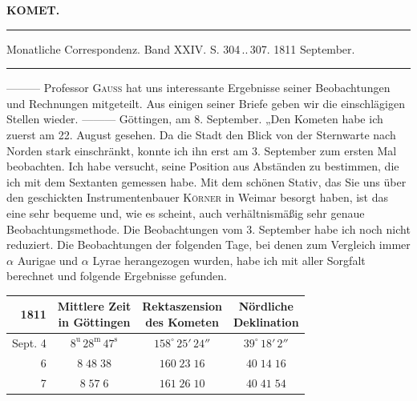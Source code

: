 \clearpage{}\hypertarget{native-340-lower}{}\label{native-340-lower}
\begin{center}\textbf{KOMET.}\par\vspace{4pt}\hrule\vspace{4pt}\fontsize{10}{12}\selectfont Monatliche Correspondenz. Band XXIV. S. 304\,..\,307. 1811 September.\par\vspace{4pt}\hrule\vspace{4pt}\end{center}

\par\indent ---\;---\;--- Professor \textsc{Gauss} hat uns interessante Ergebnisse seiner Beobachtungen und Rechnungen mitgeteilt. Aus einigen seiner Briefe geben wir die einschlägigen Stellen wieder. ---\;---\;--- Göttingen, am 8. September. „Den Kometen habe ich zuerst am 22. August gesehen. Da die Stadt den Blick von der Sternwarte nach Norden stark einschränkt, konnte ich ihn erst am 3. September zum ersten Mal beobachten. Ich habe versucht, seine Position aus Abständen zu bestimmen, die ich mit dem Sextanten gemessen habe. Mit dem schönen Stativ, das Sie uns über den geschickten Instrumentenbauer \textsc{Körner} in Weimar besorgt haben, ist das eine sehr bequeme und, wie es scheint, auch verhältnismäßig sehr genaue Beobachtungsmethode. Die Beobachtungen vom 3. September habe ich noch nicht reduziert. Die Beobachtungen der folgenden Tage, bei denen zum Vergleich immer $\alpha$ Aurigae und $\alpha$ Lyrae herangezogen wurden, habe ich mit aller Sorgfalt berechnet und folgende Ergebnisse gefunden.
\begin{center}\fontsize{10}{12}\selectfont\setlength{\tabcolsep}{4pt}\renewcommand{\arraystretch}{1.15}\begin{tabular}{r|c|c|c}
1811 & \shortstack{Mittlere Zeit\\in Göttingen} & \shortstack{Rektaszension\\des Kometen} & \shortstack{Nördliche\\Deklination}\\\hline
Sept. 4 & $8^{\mathrm u}\,28^{\mathrm m}\,47^{\mathrm s}$ & $158^\circ\,25'\,24''$ & $39^\circ\,18'\,2''$\\
6 & $8\;48\;38$ & $160\;23\;16$ & $40\;14\;16$\\
7 & $8\;57\;6$ & $161\;26\;10$ & $40\;41\;54$\\
\end{tabular}\end{center}

